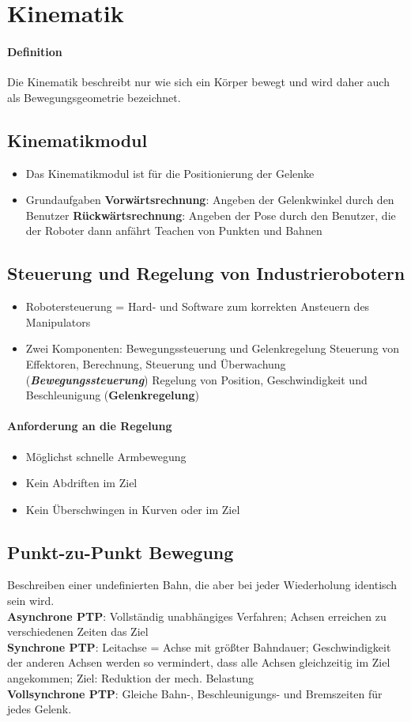 \section{Kinematik}
\paragraph{Definition}
Die Kinematik beschreibt nur wie sich ein Körper bewegt und wird daher auch als Bewegungsgeometrie bezeichnet.
\subsection{Kinematikmodul}
\begin{itemize}
	\item Das Kinematikmodul ist für die Positionierung der Gelenke
	\item Grundaufgaben
	\subitem \textbf{Vorwärtsrechnung}: Angeben der Gelenkwinkel durch den Benutzer
	\subitem \textbf{Rückwärtsrechnung}: Angeben der Pose durch den Benutzer, die der Roboter dann anfährt
	\subitem Teachen von Punkten und Bahnen
\end{itemize}
\subsection{Steuerung und Regelung von Industrierobotern}
\begin{itemize}
	\item Robotersteuerung = Hard- und Software zum korrekten Ansteuern des Manipulators
	\item Zwei Komponenten: Bewegungssteuerung und Gelenkregelung
	\subitem Steuerung von Effektoren, Berechnung, Steuerung und Überwachung (\textbf{\textit{Bewegungssteuerung}})
	\subitem Regelung von Position, Geschwindigkeit und Beschleunigung (\textbf{Gelenkregelung}) 
\end{itemize}
\paragraph{Anforderung an die Regelung}
\begin{itemize}
	\item Möglichst schnelle Armbewegung
	\item Kein Abdriften im Ziel
	\item Kein Überschwingen in Kurven oder im Ziel
\end{itemize}
\subsection{Punkt-zu-Punkt Bewegung}
Beschreiben einer undefinierten Bahn, die aber bei jeder Wiederholung identisch sein wird.\\
\textbf{Asynchrone PTP}: Vollständig unabhängiges Verfahren; Achsen erreichen zu verschiedenen Zeiten das Ziel\\
\textbf{Synchrone PTP}: Leitachse = Achse mit größter Bahndauer; Geschwindigkeit der anderen Achsen werden so vermindert, dass alle Achsen gleichzeitig im Ziel angekommen; Ziel: Reduktion der mech. Belastung\\
\textbf{Vollsynchrone PTP}: Gleiche Bahn-, Beschleunigungs- und Bremszeiten für jedes Gelenk.
